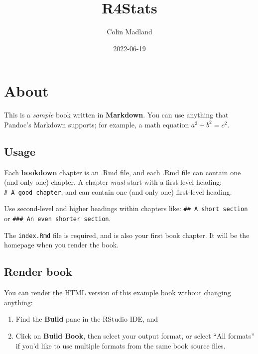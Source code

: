 \documentclass[
]{book}
\title{R4Stats}
\author{Colin Madland}
\date{2022-06-19}
\theoremstyle{definition}
\theoremstyle{definition}
\theoremstyle{definition}
\theoremstyle{definition}
\theoremstyle{remark}
\begin{document}
\maketitle

{
\setcounter{tocdepth}{1}
\tableofcontents
}
\hypertarget{about}{%
\chapter*{About}\label{about}}

This is a \emph{sample} book written in \textbf{Markdown}. You can use anything that Pandoc's Markdown supports; for example, a math equation \(a^2 + b^2 = c^2\).

\hypertarget{usage}{%
\section*{Usage}\label{usage}}

Each \textbf{bookdown} chapter is an .Rmd file, and each .Rmd file can contain one (and only one) chapter. A chapter \emph{must} start with a first-level heading: \texttt{\#\ A\ good\ chapter}, and can contain one (and only one) first-level heading.

Use second-level and higher headings within chapters like: \texttt{\#\#\ A\ short\ section} or \texttt{\#\#\#\ An\ even\ shorter\ section}.

The \texttt{index.Rmd} file is required, and is also your first book chapter. It will be the homepage when you render the book.

\hypertarget{render-book}{%
\section*{Render book}\label{render-book}}

You can render the HTML version of this example book without changing anything:

\begin{enumerate}
\def\labelenumi{\arabic{enumi}.}
\item
  Find the \textbf{Build} pane in the RStudio IDE, and
\item
  Click on \textbf{Build Book}, then select your output format, or select ``All formats'' if you'd like to use multiple formats from the same book source files.
\end{enumerate}
\end{document}
